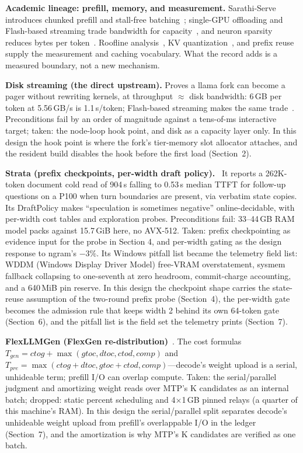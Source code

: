\documentclass[letterpaper,twocolumn,10pt]{article}
\begin{document}
\textbf{Academic lineage: prefill, memory, and measurement.} Sarathi-Serve
introduces chunked prefill and stall-free batching~\cite{sarathi2024};
single-GPU offloading and Flash-based streaming trade bandwidth for
capacity~\cite{flexgen2023,llmflash2024}, and neuron sparsity reduces bytes per
token~\cite{powerinfer2024}. Roofline analysis~\cite{williams2009}, KV
quantization~\cite{kivi2024}, and prefix reuse~\cite{promptcache2024} supply
the measurement and caching vocabulary. What the record adds is a measured
boundary, not a new mechanism.

\textbf{Disk streaming (the direct upstream).} Proves a llama fork can become
a pager without rewriting kernels, at throughput $\approx$ disk bandwidth:
6\,GB per token at 5.56\,GB/s is 1.1\,s/token; Flash-based streaming makes the
same trade~\cite{llmflash2024}. Preconditions fail by an order
of magnitude against a tens-of-ms interactive target; taken: the node-loop
hook point, and disk as a capacity layer only. In this design the hook point
is where the fork's tier-memory slot allocator attaches, and the resident
build disables the hook before the first load (Section~2).

\textbf{Strata (prefix checkpoints, per-width draft policy).}~\cite{Strata2026}
It reports a 262K-token document cold read of 904\,s falling to 0.53\,s median
TTFT for follow-up questions on a P100 when turn boundaries are present, via
verbatim state copies. Its DraftPolicy makes ``speculation is sometimes
negative'' online-decidable, with per-width cost tables and exploration probes.
Preconditions fail: 33--44\,GB RAM model packs against 15.7\,GiB here, no
AVX-512. Taken: prefix checkpointing as evidence input for the probe in
Section 4, and per-width gating as the design response to ngram's $-3\%$. Its
Windows pitfall list became the telemetry field list: WDDM (Windows Display
Driver Model) free-VRAM overstatement, sysmem fallback collapsing
to one-seventh at zero headroom, commit-charge accounting, and a 640\,MiB pin
reserve. In this design the checkpoint shape carries the state-reuse
assumption of the two-round prefix probe (Section~4), the per-width gate
becomes the admission rule that keeps width 2 behind its own 64-token gate
(Section~6), and the pitfall list is the field set the telemetry prints
(Section~7).

\textbf{FlexLLMGen (FlexGen re-distribution)}~\cite{flexgen2023,flexllmgen}. The cost formulas
$T_{gen}=ctog+\max(gtoc,dtoc,ctod,comp)$ and
$T_{pre}=\max(ctog+dtoc,gtoc+ctod,comp)$---decode's weight upload is a serial,
unhideable term; prefill I/O can overlap compute. Taken: the serial/parallel
judgment and amortizing weight reads over MTP's K candidates as an internal
batch; dropped: static percent scheduling and 4$\times$1\,GB pinned relays (a
quarter of this machine's RAM). In this design the serial/parallel split
separates decode's unhideable weight upload from prefill's overlappable I/O in
the ledger (Section~7), and the amortization is why MTP's K candidates are
verified as one batch.
\end{document}
